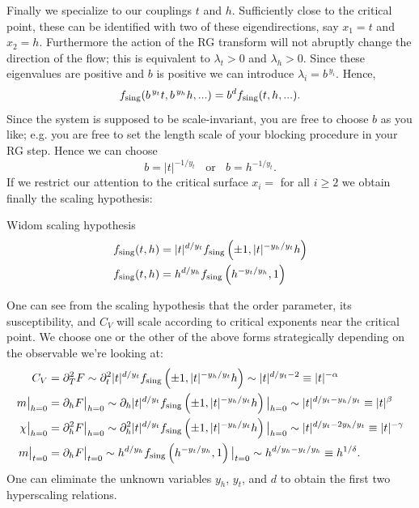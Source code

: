 Finally we specialize to our couplings $t$ and $h$. Sufficiently close to the
critical point, these can be identified with two of these eigendirections, say
$x_1=t$ and $x_2=h$. Furthermore the action of the RG transform will not abruptly
change the direction of the flow; this is equivalent to $\lambda_t>0$ and
$\lambda_h>0$. Since these eigenvalues are positive and $b$ is positive we
can introduce $\lambda_i=b^{\,y_i}$. Hence,
\begin{equation}\label{eq:widom3}
  f_{\text{sing}}(b^{\,y_t}t,b^{\,y_h}h,...)=b^df_{\text{sing}}(t,h,...).
\end{equation}
Since the system is supposed to be scale-invariant, you are free to choose $b$
as you like; e.g. you are free to set the length scale of your blocking
procedure in your RG step. Hence we can choose
\begin{equation}
  b=|t|^{-1/y_t}~~~~\text{or}~~~~b=h^{-1/y_t}.
\end{equation} 
If we restrict our attention to the critical surface $x_i=$ for all $i\geq2$
we obtain finally the scaling hypothesis:
\begin{theorem}{Widom scaling hypothesis}{}
  \begin{equation*}\begin{aligned}
    f_{\text{sing}}(t,h)&=|t|^{d/y_t}f_{\text{sing}}\left(\pm1,|t|^{-y_h/y_t}h\right)\\
    f_{\text{sing}}(t,h)&=h^{d/y_h}f_{\text{sing}}\left(h^{-y_t/y_h},1\right)
  \end{aligned}\end{equation*}
\end{theorem}

One can see from the scaling hypothesis that the order parameter, its
susceptibility, and $C_V$ will scale according to critical exponents
near the critical point. We choose one or the other of the above forms
strategically depending on the observable we're looking at:
\begin{equation}\begin{aligned}
  C_V&=\partial_T^2 F
     \sim\partial_t^2 |t|^{d/y_t}f_{\text{sing}}\left(\pm1,|t|^{-y_h/y_t}h\right)
     \sim|t|^{d/y_t-2}
     \equiv|t|^{-\alpha}\\
  m\big|_{h=0}&=\partial_h F\big|_{h=0}
     \sim\partial_h |t|^{d/y_t}f_{\text{sing}}\left(\pm1,|t|^{-y_h/y_t}h\right)\big|_{h=0}
     \sim|t|^{d/y_t-y_h/y_t}
     \equiv|t|^{\beta}\\
  \chi\big|_{h=0}&=\partial^2_h F\big|_{h=0}
     \sim\partial^2_h |t|^{d/y_t}f_{\text{sing}}\left(\pm1,|t|^{-y_h/y_t}h\right)\big|_{h=0}
     \sim|t|^{d/y_t-2y_h/y_t}
     \equiv|t|^{-\gamma}\\
  m\big|_{t=0}&=\partial_h F\big|_{t=0}
     \sim h^{d/y_h}f_{\text{sing}}\left(h^{-y_t/y_h},1\right)\big|_{t=0}
     \sim h^{d/y_h-y_t/y_h}
     \equiv h^{1/\delta}.
\end{aligned}\end{equation}
One can eliminate the unknown variables $y_h$, $y_t$, and $d$ to obtain
the first two hyperscaling relations.


